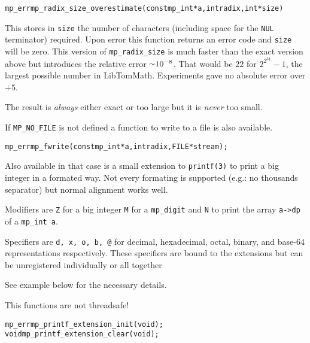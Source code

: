 \documentclass[synpaper]{book}
\def\approx{\raisebox{0.2ex}{\mbox{\small $\sim$}}}
\begin{document}
\begin{alltt}
mp_err mp_radix_size_overestimate (const mp_int *a, int radix, int *size)
\end{alltt}
This stores in \texttt{size} the number of characters (including space for the \texttt{NUL}
terminator) required. Upon error this function returns an error code and \texttt{size} will be
zero. This version of \texttt{mp\_radix\_size} is much faster than the exact version above but
introduces the relative error $\approx 10^{-8}$. That would be $22$ for $2^{2^{31}}-1$, the
largest possible number in LibTomMath. Experiments gave no absolute error over $+5$.

The result is \emph{always} either exact or too large but it is \emph{never} too small.


If \texttt{MP\_NO\_FILE} is not defined a function to write to a file is also available.

\begin{alltt}
mp_err mp_fwrite(const mp_int *a, int radix, FILE *stream);
\end{alltt}

Also available in that case is a small extension to \texttt{printf(3)} to print
a big integer in a formated way. Not every formating is supported (e.g.: no
thousands separator) but normal alignment works well.

Modifiers are \texttt{Z} for a big integer \texttt{M} for a \texttt{mp\_digit} and
\texttt{N} to print the array \texttt{a->dp} of a \texttt{mp\_int a}.

Specifiers are \texttt{d, x, o, b, @} for decimal, hexadecimal, octal, binary, and
base-64 representations respectively. These specifiers are bound to the extensions
but can be unregistered individually or all together

See example below for the necessary details.

This functions are not threadsafe!
\begin{alltt}
mp_err mp_printf_extension_init(void);
void mp_printf_extension_clear(void);
\end{alltt}
\end{document}
